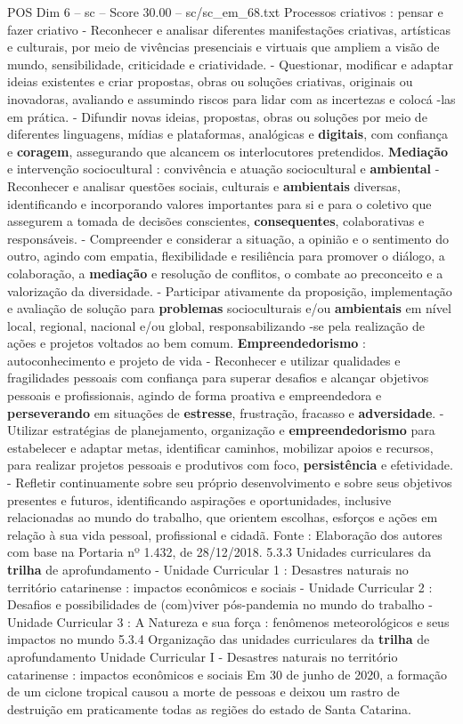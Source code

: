 \begin{textsample}{POS Dim 6 – sc – Score 30.00 – sc/sc\_em\_68.txt}
Processos criativos : pensar e fazer criativo - Reconhecer e analisar diferentes manifestações criativas, artísticas e culturais, por meio de vivências presenciais e virtuais que ampliem a visão de mundo, sensibilidade, criticidade e criatividade. - Questionar, modificar e adaptar ideias existentes e criar propostas, obras ou soluções criativas, originais ou inovadoras, avaliando e assumindo riscos para lidar com as incertezas e colocá -las em prática. - Difundir novas ideias, propostas, obras ou soluções por meio de diferentes linguagens, mídias e plataformas, analógicas e \textbf{digitais}, com confiança e \textbf{coragem}, assegurando que alcancem os interlocutores pretendidos. \textbf{Mediação} e intervenção sociocultural : convivência e atuação sociocultural e \textbf{ambiental} - Reconhecer e analisar questões sociais, culturais e \textbf{ambientais} diversas, identificando e incorporando valores importantes para si e para o coletivo que assegurem a tomada de decisões conscientes, \textbf{consequentes}, colaborativas e responsáveis. - Compreender e considerar a situação, a opinião e o sentimento do outro, agindo com empatia, flexibilidade e resiliência para promover o diálogo, a colaboração, a \textbf{mediação} e resolução de conflitos, o combate ao preconceito e a valorização da diversidade. - Participar ativamente da proposição, implementação e avaliação de solução para \textbf{problemas} socioculturais e/ou \textbf{ambientais} em nível local, regional, nacional e/ou global, responsabilizando -se pela realização de ações e projetos voltados ao bem comum. \textbf{Empreendedorismo} : autoconhecimento e projeto de vida - Reconhecer e utilizar qualidades e fragilidades pessoais com confiança para superar desafios e alcançar objetivos pessoais e profissionais, agindo de forma proativa e empreendedora e \textbf{perseverando} em situações de \textbf{estresse}, frustração, fracasso e \textbf{adversidade}. - Utilizar estratégias de planejamento, organização e \textbf{empreendedorismo} para estabelecer e adaptar metas, identificar caminhos, mobilizar apoios e recursos, para realizar projetos pessoais e produtivos com foco, \textbf{persistência} e efetividade. - Refletir continuamente sobre seu próprio desenvolvimento e sobre seus objetivos presentes e futuros, identificando aspirações e oportunidades, inclusive relacionadas ao mundo do trabalho, que orientem escolhas, esforços e ações em relação à sua vida pessoal, profissional e cidadã.
Fonte : Elaboração dos autores com base na Portaria nº 1.432, de 28/12/2018. 5.3.3 Unidades curriculares da \textbf{trilha} de aprofundamento - Unidade Curricular 1 : Desastres naturais no território catarinense : impactos econômicos e sociais - Unidade Curricular 2 : Desafios e possibilidades de (com)viver pós-pandemia no mundo do trabalho - Unidade Curricular 3 : A Natureza e sua força : fenômenos meteorológicos e seus impactos no mundo 5.3.4 Organização das unidades curriculares da \textbf{trilha} de aprofundamento Unidade Curricular I - Desastres naturais no território catarinense : impactos econômicos e sociais Em 30 de junho de 2020, a formação de um ciclone tropical causou a morte de pessoas e deixou um rastro de destruição em praticamente todas as regiões do estado de Santa Catarina.

\end{textsample}
